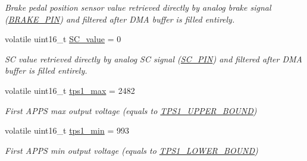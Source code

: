 \begin{DoxyCompactItemize}
\begin{DoxyCompactList}\small\item\em Brake pedal position sensor value retrieved directly by analog brake signal (\mbox{\hyperlink{group___board__model__group_gad632b56bf4c6259a390c3db91607078e}{B\+R\+A\+K\+E\+\_\+\+P\+IN}}) and filtered after D\+MA buffer is filled entirely. \end{DoxyCompactList}\item 
\mbox{\label{group___board__model__group_ga0b4151ed3267a5fae4789f4b3ffe7bbd}} 
volatile uint16\+\_\+t \mbox{\hyperlink{group___board__model__group_ga0b4151ed3267a5fae4789f4b3ffe7bbd}{S\+C\+\_\+value}} = 0
\begin{DoxyCompactList}\small\item\em SC value retrieved directly by analog SC signal (\mbox{\hyperlink{group___board__model__group_gabbdb157ae4ad39d102935c21fa30d1c5}{S\+C\+\_\+\+P\+IN}}) and filtered after D\+MA buffer is filled entirely. \end{DoxyCompactList}\item 
\mbox{\label{group___board__model__group_gaf1d46fb483b2a63c3da25c11688af7c4}} 
volatile uint16\+\_\+t \mbox{\hyperlink{group___board__model__group_gaf1d46fb483b2a63c3da25c11688af7c4}{tps1\+\_\+max}} = 2482
\begin{DoxyCompactList}\small\item\em First A\+P\+PS max output voltage (equals to \mbox{\hyperlink{group___board__model__group_ga6741cba3daf129b6f73eed1b1db09519}{T\+P\+S1\+\_\+\+U\+P\+P\+E\+R\+\_\+\+B\+O\+U\+ND}}) \end{DoxyCompactList}\item 
\mbox{\label{group___board__model__group_gab7d6ace1f9174e39ed6abbe4aaceb7f4}} 
volatile uint16\+\_\+t \mbox{\hyperlink{group___board__model__group_gab7d6ace1f9174e39ed6abbe4aaceb7f4}{tps1\+\_\+min}} = 993
\begin{DoxyCompactList}\small\item\em First A\+P\+PS min output voltage (equals to \mbox{\hyperlink{group___board__model__group_ga9c9aa914f6b372d9ef3f15ce4108da6a}{T\+P\+S1\+\_\+\+L\+O\+W\+E\+R\+\_\+\+B\+O\+U\+ND}}) \end{DoxyCompactList}\item 
\mbox{\label{group___board__model__group_ga53381436ea8db96c356db8b305bec988}} 

\end{DoxyCompactItemize}
